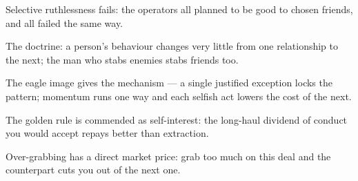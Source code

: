 

\begin{distilled}
  \item Selective ruthlessness fails: the operators all planned to be good to chosen friends, and all failed the same way.
  \item The doctrine: a person's behaviour changes very little from one relationship to the next; the man who stabs enemies stabs friends too.
  \item The eagle image gives the mechanism --- a single justified exception locks the pattern; momentum runs one way and each selfish act lowers the cost of the next.
  \item The golden rule is commended as self-interest: the long-haul dividend of conduct you would accept repays better than extraction.
  \item Over-grabbing has a direct market price: grab too much on this deal and the counterpart cuts you out of the next one.
\end{distilled}
